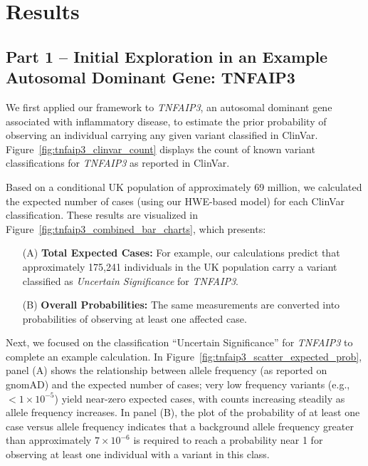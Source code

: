 \section{Results}

\subsection{Part 1 -- Initial Exploration in an Example Autosomal Dominant Gene: TNFAIP3}
We first applied our framework to \textit{TNFAIP3}, an autosomal dominant gene associated with inflammatory disease, to estimate the prior probability of observing an individual carrying any given variant classified in ClinVar. Figure~\ref{fig:tnfaip3_clinvar_count} displays the count of known variant classifications for \textit{TNFAIP3} as reported in ClinVar. 

Based on a conditional UK population of approximately 69 million, we calculated the expected number of cases (using our HWE-based model) for each ClinVar classification. These results are visualized in Figure~\ref{fig:tnfaip3_combined_bar_charts}, which presents:
\begin{enumerate}
    \item[(A)] \textbf{Total Expected Cases:} For example, our calculations predict that approximately 175,241 individuals in the UK population carry a variant classified as \textit{Uncertain Significance} for \textit{TNFAIP3}.
    \item[(B)] \textbf{Overall Probabilities:} The same measurements are converted into probabilities of observing at least one affected case.
\end{enumerate}

Next, we focused on the classification “Uncertain Significance” for \textit{TNFAIP3} to complete an example calculation. In Figure~\ref{fig:tnfaip3_scatter_expected_prob}, panel (A) shows the relationship between allele frequency (as reported on gnomAD) and the expected number of cases; very low frequency variants (e.g., \(<1\times10^{-5}\)) yield near-zero expected cases, with counts increasing steadily as allele frequency increases. In panel (B), the plot of the probability of at least one case versus allele frequency indicates that a background allele frequency greater than approximately \(7\times10^{-6}\) is required to reach a probability near 1 for observing at least one individual with a variant in this class.

